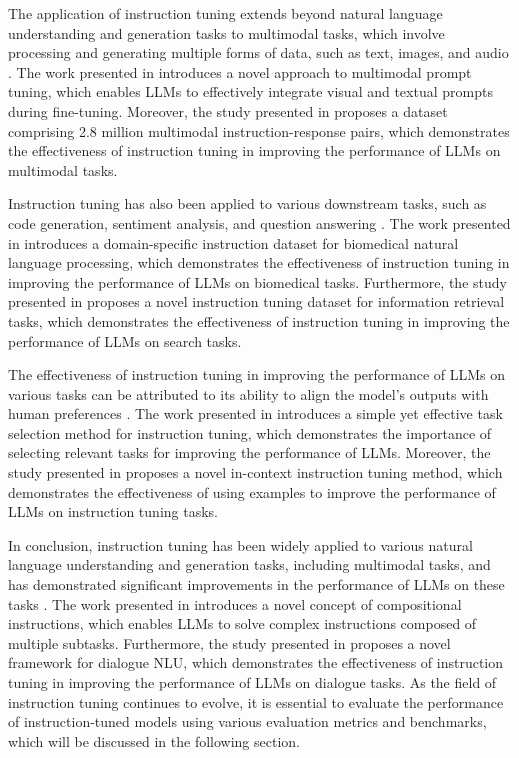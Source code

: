 \documentclass[11pt]{article}
\begin{document}
The application of instruction tuning extends beyond natural language understanding and generation tasks to multimodal tasks, which involve processing and generating multiple forms of data, such as text, images, and audio \cite{ref66,ref74}. The work presented in \cite{ref66} introduces a novel approach to multimodal prompt tuning, which enables LLMs to effectively integrate visual and textual prompts during fine-tuning. Moreover, the study presented in \cite{ref74} proposes a dataset comprising 2.8 million multimodal instruction-response pairs, which demonstrates the effectiveness of instruction tuning in improving the performance of LLMs on multimodal tasks.

Instruction tuning has also been applied to various downstream tasks, such as code generation, sentiment analysis, and question answering \cite{ref75,ref76}. The work presented in \cite{ref75} introduces a domain-specific instruction dataset for biomedical natural language processing, which demonstrates the effectiveness of instruction tuning in improving the performance of LLMs on biomedical tasks. Furthermore, the study presented in \cite{ref76} proposes a novel instruction tuning dataset for information retrieval tasks, which demonstrates the effectiveness of instruction tuning in improving the performance of LLMs on search tasks.

The effectiveness of instruction tuning in improving the performance of LLMs on various tasks can be attributed to its ability to align the model's outputs with human preferences \cite{ref24,ref38}. The work presented in \cite{ref24} introduces a simple yet effective task selection method for instruction tuning, which demonstrates the importance of selecting relevant tasks for improving the performance of LLMs. Moreover, the study presented in \cite{ref38} proposes a novel in-context instruction tuning method, which demonstrates the effectiveness of using examples to improve the performance of LLMs on instruction tuning tasks.

In conclusion, instruction tuning has been widely applied to various natural language understanding and generation tasks, including multimodal tasks, and has demonstrated significant improvements in the performance of LLMs on these tasks \cite{ref77,ref78}. The work presented in \cite{ref77} introduces a novel concept of compositional instructions, which enables LLMs to solve complex instructions composed of multiple subtasks. Furthermore, the study presented in \cite{ref78} proposes a novel framework for dialogue NLU, which demonstrates the effectiveness of instruction tuning in improving the performance of LLMs on dialogue tasks. As the field of instruction tuning continues to evolve, it is essential to evaluate the performance of instruction-tuned models using various evaluation metrics and benchmarks, which will be discussed in the following section.
\end{document}
